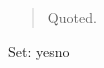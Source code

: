 \documentclass{article}
\begin{document}
\begin{quote} Quoted. \end{quote}
Set: \ifdefined\ProcessKeyvalOptions yes\else no\fi
\end{document}
